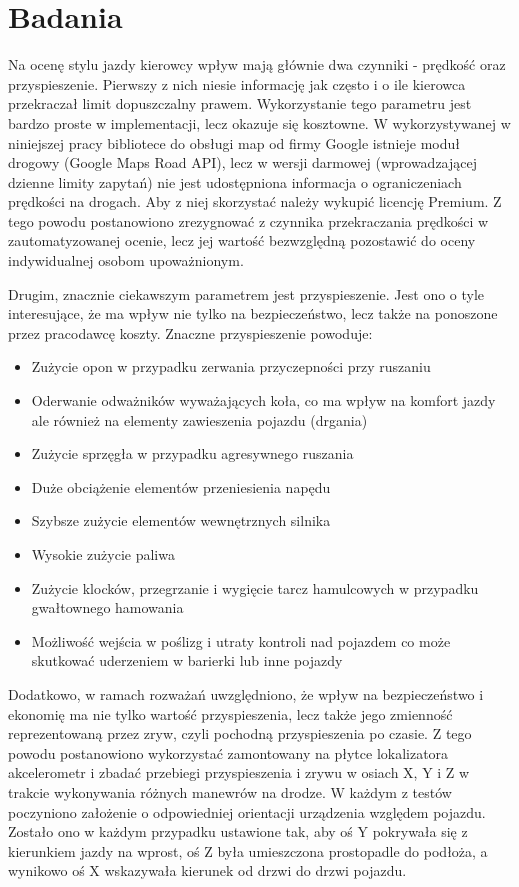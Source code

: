 \clearpage
\section{Badania}
\label{experiments}

Na ocenę stylu jazdy kierowcy wpływ mają głównie dwa czynniki - prędkość oraz przyspieszenie. Pierwszy z nich niesie informację jak często i o ile kierowca przekraczał limit dopuszczalny prawem. Wykorzystanie tego parametru jest bardzo proste w implementacji, lecz okazuje się kosztowne. W wykorzystywanej w niniejszej pracy bibliotece do obsługi map od firmy Google istnieje moduł drogowy (Google Maps Road API\cite{google_map_road_api}), lecz w wersji darmowej (wprowadzającej dzienne limity zapytań) nie jest udostępniona informacja o ograniczeniach prędkości na drogach. Aby z niej skorzystać należy wykupić licencję Premium. Z tego powodu postanowiono zrezygnować z czynnika przekraczania prędkości w zautomatyzowanej ocenie, lecz jej wartość bezwzględną pozostawić do oceny indywidualnej osobom upoważnionym.

Drugim, znacznie ciekawszym parametrem jest przyspieszenie. Jest ono o tyle interesujące, że ma wpływ nie tylko na bezpieczeństwo, lecz także na ponoszone przez pracodawcę koszty. Znaczne przyspieszenie powoduje:

\begin{itemize}
\item Zużycie opon w przypadku zerwania przyczepności przy ruszaniu
\item Oderwanie odważników wyważających koła, co ma wpływ na komfort jazdy ale również na elementy zawieszenia pojazdu (drgania)
\item Zużycie sprzęgła w przypadku agresywnego ruszania
\item Duże obciążenie elementów przeniesienia napędu
\item Szybsze zużycie elementów wewnętrznych silnika
\item Wysokie zużycie paliwa 
\item Zużycie klocków, przegrzanie i wygięcie tarcz hamulcowych w przypadku gwałtownego hamowania
\item Możliwość wejścia w poślizg i utraty kontroli nad pojazdem co może skutkować uderzeniem w barierki lub inne pojazdy
\end{itemize}

Dodatkowo, w ramach rozważań uwzględniono, że wpływ na bezpieczeństwo i ekonomię ma nie tylko wartość przyspieszenia, lecz także jego zmienność reprezentowaną przez zryw, czyli pochodną przyspieszenia po czasie. Z tego powodu postanowiono wykorzystać zamontowany na płytce lokalizatora akcelerometr i zbadać przebiegi przyspieszenia i zrywu w osiach X, Y i Z w trakcie wykonywania różnych manewrów na drodze. W każdym z testów poczyniono założenie o odpowiedniej orientacji urządzenia względem pojazdu. Zostało ono w każdym przypadku ustawione tak, aby oś Y pokrywała się z kierunkiem jazdy na wprost, oś Z była umieszczona prostopadle do podłoża, a wynikowo oś X wskazywała kierunek od drzwi do drzwi pojazdu.

